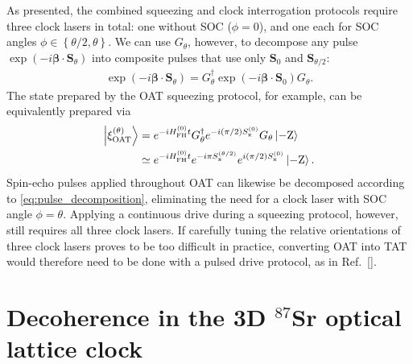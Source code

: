 \documentclass[aps,prx,superscriptaddress,notitlepage,twocolumn,longbibliography]{revtex4-2}
\renewcommand{\t}{\text} %
\newcommand{\p}[1]{\left(#1\right)} %
\renewcommand{\set}[1]{\left\{#1\right\}} %
\renewcommand{\c}{\cdot} %
\renewcommand{\v}{\bm} %
\renewcommand{\ket}{\Ket}
\newcommand{\x}{\text{x}}
\begin{document}
As presented, the combined squeezing and clock interrogation protocols require three clock lasers in total: one without SOC ($\phi=0$), and one each for SOC angles $\phi\in\set{\theta/2,\theta}$.
We can use $G_\theta$, however, to decompose any pulse $\exp\p{-i\v\beta\c\v S_\theta}$ into composite pulses that use only $\v S_0$ and $\v S_{\theta/2}$:
\begin{align}
  \exp\p{-i\v\beta\c\v S_\theta}
  = G_\theta^\dag \exp\p{-i\v\beta\c\v S_0} G_\theta.
  \label{eq:pulse_decomposition}
\end{align}
The state prepared by the OAT squeezing protocol, for example, can be equivalently prepared via
\begin{align}
  \ket{\xi_{\t{OAT}}^{(\theta)}}
  &= e^{-i H_{\t{FH}}^{(0)}t} G_\theta^\dag
  e^{-i\p{\pi/2}S_\x^{(0)}} G_\theta \ket{-\t{Z}} \notag \\
  &\simeq e^{-i H_{\t{FH}}^{(0)}t} e^{-i\pi S_\x^{(\theta/2)}}
  e^{i\p{\pi/2} S_\x^{(0)}} \ket{-\t{Z}}.
\end{align}
Spin-echo pulses applied throughout OAT can likewise be decomposed according to \eqref{eq:pulse_decomposition}, eliminating the need for a clock laser with SOC angle $\phi=\theta$.
Applying a continuous drive during a squeezing protocol, however, still requires all three clock lasers.
If carefully tuning the relative orientations of three clock lasers proves to be too difficult in practice, converting OAT into TAT would therefore need to be done with a pulsed drive protocol, as in Ref.~[].

\section{Decoherence in the 3D $^{87}$Sr optical lattice clock}
\label{sec:decoherence}
\end{document}
